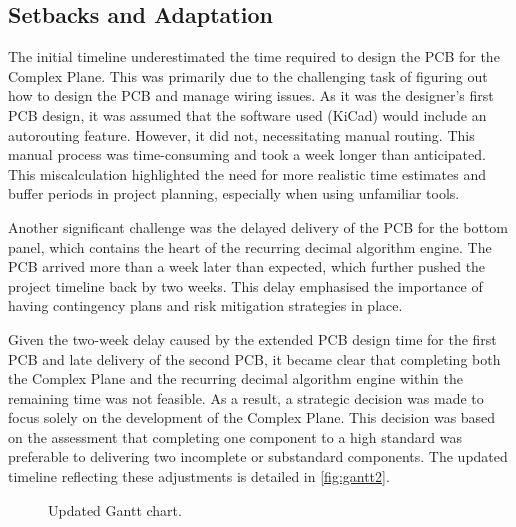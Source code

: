 \documentclass[12pt]{article}
\numberwithin{subsubsubsection}{subsubsection}
\begin{document}
\subsection{Setbacks and Adaptation}

The initial timeline underestimated the time required to design the PCB for the Complex Plane. This was primarily due to the challenging task of figuring out how to design the PCB and manage wiring issues. As it was the designer's first PCB design, it was assumed that the software used (KiCad) would include an autorouting feature. However, it did not, necessitating manual routing. This manual process was time-consuming and took a week longer than anticipated. This miscalculation highlighted the need for more realistic time estimates and buffer periods in project planning, especially when using unfamiliar tools.

Another significant challenge was the delayed delivery of the PCB for the bottom panel, which contains the heart of the recurring decimal algorithm engine. The PCB arrived more than a week later than expected, which further pushed the project timeline back by two weeks. This delay emphasised the importance of having contingency plans and risk mitigation strategies in place.

Given the two-week delay caused by the extended PCB design time for the first PCB and late delivery of the second PCB, it became clear that completing both the Complex Plane and the recurring decimal algorithm engine within the remaining time was not feasible. As a result, a strategic decision was made to focus solely on the development of the Complex Plane. This decision was based on the assessment that completing one component to a high standard was preferable to delivering two incomplete or substandard components. The updated timeline reflecting these adjustments is detailed in \autoref{fig:gantt2}.



\begin{figure}[H]
    \centering
    \caption{Updated Gantt chart.}
    \label{fig:gantt2}
\end{figure}
\end{document}
